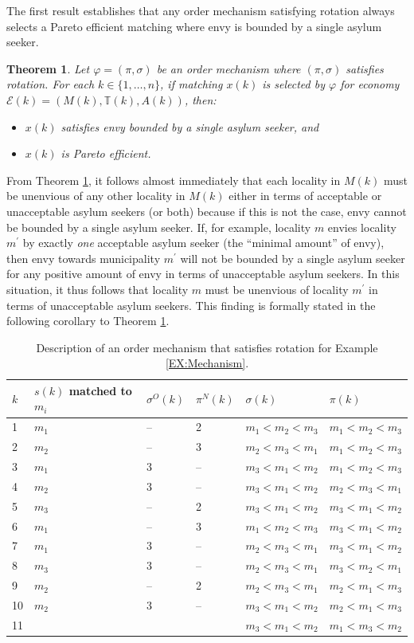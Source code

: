 \documentclass[12pt,fleqn]{article}
\newtheorem{theorem}{Theorem}
\begin{document}
\noindent The first result establishes that any order mechanism satisfying rotation always selects a Pareto efficient matching where envy is bounded by a single asylum seeker.

\begin{theorem}\rm\label{THEOREM:envy_efficiency}
Let $\varphi=(\pi,\sigma)$ be an order mechanism where $(\pi,\sigma)$ satisfies rotation.
For each $k\in \{1,\ldots,n\}$, if matching $x(k)$ is selected by $\varphi$ for economy $\mathcal{E}(k)=(M(k),\mathbb{T}(k),A(k))$, then:
\begin{itemize}
\item[(i)] $x(k)$ satisfies envy bounded by a single asylum seeker, and
\item[(ii)] $x(k)$ is Pareto efficient.
\end{itemize}
\end{theorem}
\noindent From Theorem \ref{THEOREM:envy_efficiency}, it follows almost immediately that each locality in $M(k)$ must be unenvious of any other locality in $M(k)$ either in terms of acceptable or unacceptable asylum seekers (or both) because if this is not the case, envy cannot be bounded by a single asylum seeker. If, for example, locality $m$ envies locality $m^\prime$ by exactly \emph{one} acceptable asylum seeker (the ``minimal amount'' of envy), then envy towards municipality $m^\prime$ will not be bounded by a single asylum seeker for any positive amount of envy in terms of unacceptable asylum seekers. In this situation, it thus follows that locality $m$ must be unenvious of locality $m^\prime$ in terms of unacceptable asylum seekers. This finding is formally stated in the following corollary to Theorem \ref{THEOREM:envy_efficiency}.

\begin{table}[h!]
\caption{Description of an order mechanism that satisfies rotation for Example \ref{EX:Mechanism}.}\label{TABLE:Mechanism}
\begin{tabular}{llllll}\hline
$k$ & $s(k)$ matched to $m_i$ & $\sigma^O(k)$ & $\pi^N(k)$ & $\sigma(k)$ & $\pi(k)$ \\ \hline
1   & $m_1$ & -- & 2 & $m_1<m_2<m_3$ & $m_1<m_2<m_3$ \\
2   & $m_2$ & -- & 3 & $m_2<m_3<m_1$ & $m_1<m_2<m_3$ \\
3   & $m_1$ & 3 & -- & $m_3<m_1<m_2$ & $m_1<m_2<m_3$ \\
4   & $m_2$ & 3 & -- & $m_3<m_1<m_2$ & $m_2<m_3<m_1$ \\
5   & $m_3$ & -- & 2 & $m_3<m_1<m_2$ & $m_3<m_1<m_2$ \\
6   & $m_1$ & -- & 3 & $m_1<m_2<m_3$ & $m_3<m_1<m_2$ \\
7   & $m_1$ & 3 & -- & $m_2<m_3<m_1$ & $m_3<m_1<m_2$ \\
8   & $m_3$ & 3 & -- & $m_2<m_3<m_1$ & $m_3<m_2<m_1$ \\
9   & $m_2$ & -- & 2 & $m_2<m_3<m_1$ & $m_2<m_1<m_3$ \\
10  & $m_2$ & 3 & -- & $m_3<m_1<m_2$ & $m_2<m_1<m_3$ \\
11  &       &   &    & $m_3<m_1<m_2$ & $m_1<m_3<m_2$ \\ \hline
\end{tabular}
\end{table}
\end{document}
